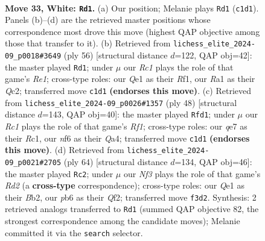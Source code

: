 \documentclass[11pt]{article}
\begin{document}
\begin{figure}[p]
\label{fig:thought-m62}
\end{figure}

\clearpage

\begin{figure}[p]\centering
\begin{subfigure}{0.46\textwidth}\centering
\resizebox{\linewidth}{!}{%
\newchessgame
\chessboard[
  setfen={3r2k1/3nq1p1/rp3n2/3p3p/P3p3/2N2NP1/2P2P1P/R1R1QK2 w - - 0 33},
  showmover=false,
  pgfstyle=straightmove, color=movearrow, markmove={c1-d1}
]}
\caption{}
\end{subfigure}\hfill
\begin{subfigure}{0.46\textwidth}\centering
\resizebox{\linewidth}{!}{%
\newchessgame
\chessboard[
  setfen={5rk1/3nr2p/pn3pp1/1p6/2pqP3/P1N3P1/1PQ3BP/4RR1K w - - 0 29},
  showmover=false,
  pgfstyle=straightmove, color=movearrow, markmove={e1-d1}
]}
\caption{}
\end{subfigure}
\\[4pt]
\begin{subfigure}{0.46\textwidth}\centering
\resizebox{\linewidth}{!}{%
\newchessgame
\chessboard[
  setfen={2r1r1k1/pq3ppp/npN1pn2/8/QP6/P3N1P1/4PP1P/2R2RK1 w - - 5 25},
  showmover=false,
  pgfstyle=straightmove, color=movearrow, markmove={f1-d1}
]}
\caption{}
\end{subfigure}\hfill
\begin{subfigure}{0.46\textwidth}\centering
\resizebox{\linewidth}{!}{%
\newchessgame
\chessboard[
  setfen={4r1k1/3r1pp1/2q2n1p/1p1pn3/1P3NP1/2p1PP1P/1B1R1QK1/3R4 w - - 0 33},
  showmover=false,
  pgfstyle=straightmove, color=movearrow, markmove={d2-c2}
]}
\caption{}
\end{subfigure}
\caption{\textbf{Move 33, White: \texttt{Rd1}.} (a) Our position; Melanie plays \texttt{Rd1} (\texttt{c1d1}). Panels (b)--(d) are the retrieved master positions whose correspondence most drove this move (highest QAP objective among those that transfer to it). (b) Retrieved from \texttt{lichess\_elite\_2024-09\_p0018\#3649} (ply 56) [structural distance $d$=122, QAP obj=42]: the master played \texttt{Rd1}; under $\mu$ our \emph{Rc1} plays the role of that game's \emph{Re1}; cross-type roles: our \emph{Q}e1 as their \emph{R}f1, our \emph{R}a1 as their \emph{Q}c2; transferred move \texttt{c1d1} \textbf{(endorses this move)}. (c) Retrieved from \texttt{lichess\_elite\_2024-09\_p0026\#1357} (ply 48) [structural distance $d$=143, QAP obj=40]: the master played \texttt{Rfd1}; under $\mu$ our \emph{Rc1} plays the role of that game's \emph{Rf1}; cross-type roles: our \emph{q}e7 as their \emph{R}c1, our \emph{n}f6 as their \emph{Q}a4; transferred move \texttt{c1d1} \textbf{(endorses this move)}. (d) Retrieved from \texttt{lichess\_elite\_2024-09\_p0021\#2705} (ply 64) [structural distance $d$=134, QAP obj=46]: the master played \texttt{Rc2}; under $\mu$ our \emph{Nf3} plays the role of that game's \emph{Rd2} (a \textbf{cross-type} correspondence); cross-type roles: our \emph{Q}e1 as their \emph{B}b2, our \emph{p}b6 as their \emph{Q}f2; transferred move \texttt{f3d2}. Synthesis: 2 retrieved analogs transferred to \texttt{Rd1} (summed QAP objective 82, the strongest correspondence among the candidate moves); Melanie committed it via the \texttt{search} selector.}

\end{figure}
\end{document}
